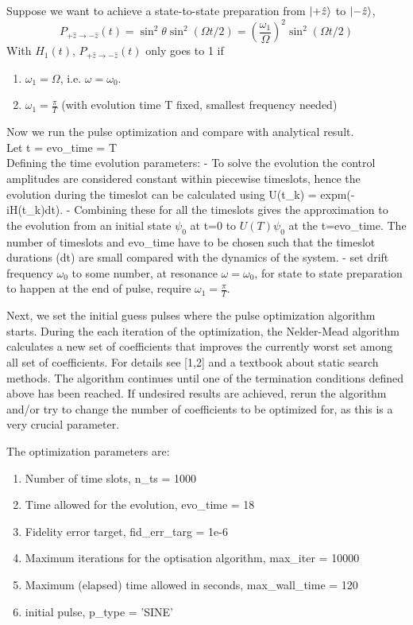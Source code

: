 \documentclass[12pt]{report}
\begin{document}
Suppose we want to achieve a state-to-state preparation from $\ket{+\hat{z}}$ to $\ket{-\hat{z}}$,  
$$
P_{+\hat{z} \rightarrow-\hat{z}}(t) = \sin ^2 \theta \sin ^2(\Omega t / 2)=\left(\frac{\omega_1}{\Omega}\right)^2 \sin ^2(\Omega t / 2)
$$
With $H_1(t)$, $P_{+\hat{z} \rightarrow-\hat{z}}(t)$ only goes to 1 if 
\begin{enumerate}
    \item $\omega_1 = \Omega$, i.e. $\omega = \omega_0$.
    \item $\omega_1 = \frac{\pi}{T}$ (with evolution time T fixed, smallest frequency needed)
\end{enumerate}
Now we run the pulse optimization and compare with analytical result.
\\
Let t = evo\_time = T
\\
Defining the time evolution parameters:
- To solve the evolution the control amplitudes are considered constant within piecewise timeslots, hence the evolution during the timeslot can be calculated using U(t\_k) = expm(-iH(t\_k)dt). 
- Combining these for all the timeslots gives the approximation to the evolution from an initial state $\psi_0$ at t=0 to $U(T)\psi_0$ at the t=evo\_time. The number of timeslots and evo\_time have to be chosen such that the timeslot durations (dt) are small compared with the dynamics of the system.
- set drift frequency $\omega_0$ to some number, at resonance $\omega = \omega_0$, for state to state preparation to happen at the end of pulse, require $\omega_1 = \frac{\pi}{T}$.
\par
Next, we set the initial guess pulses where the pulse optimization algorithm starts. 
During the each iteration of the optimization, the Nelder-Mead algorithm calculates a new set of coefficients that improves the currently worst set among all set of coefficients. For details see [1,2] and a textbook about static search methods. 
The algorithm continues until one of the termination conditions defined above has been reached. If undesired results are achieved, rerun the algorithm and/or try to change the number of coefficients to be optimized for, as this is a very crucial parameter.  

The optimization parameters are: 
\begin{enumerate}
    \item Number of time slots, n\_ts = 1000
    \item Time allowed for the evolution, evo\_time = 18
    \item Fidelity error target, fid\_err\_targ = 1e-6
    \item Maximum iterations for the optisation algorithm, max\_iter = 10000
    \item Maximum (elapsed) time allowed in seconds, max\_wall\_time = 120
    \item initial pulse, p\_type = 'SINE'
\end{enumerate}
\end{document}
